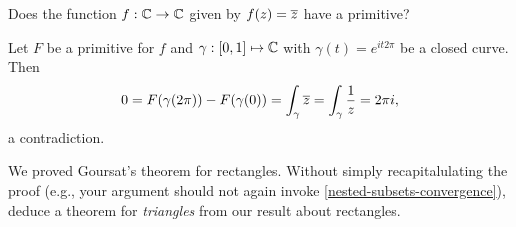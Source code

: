 \documentclass{homework}
\begin{document}
                                                \begin{problem}\label{conjz_no_primitive}
                                                  Does the function $f : \mathbb{C} \to \mathbb{C}$ given by $f(z) = \overline{z}$ have a
                                                    primitive?
                                                    \end{problem}
                                                    \begin{solution}
                                                    Let $F$ be a primitive for $f$ and $\gamma: [0,1]\mapsto \mathbb{C}$ with $\gamma(t)=e^{it2\pi}$ be a closed curve.
                                                    Then
                                                    \begin{align*}
                                                        0 = F(\gamma(2\pi)) - F(\gamma(0)) = \int_\gamma \overline{z} = \int_\gamma \frac{1}{z} = 2\pi i,
                                                        \end{align*}
                                                        a contradiction.
                                                        \end{solution}
                                                        \begin{problem}
                                                          We proved Goursat's theorem for rectangles.  Without simply
                                                            recapitalulating the proof (e.g., your argument should not again
                                                              invoke \ref{nested-subsets-convergence}), deduce a theorem for
                                                                \textit{triangles} from our result about rectangles.
                                                                \end{problem}
\end{document}
